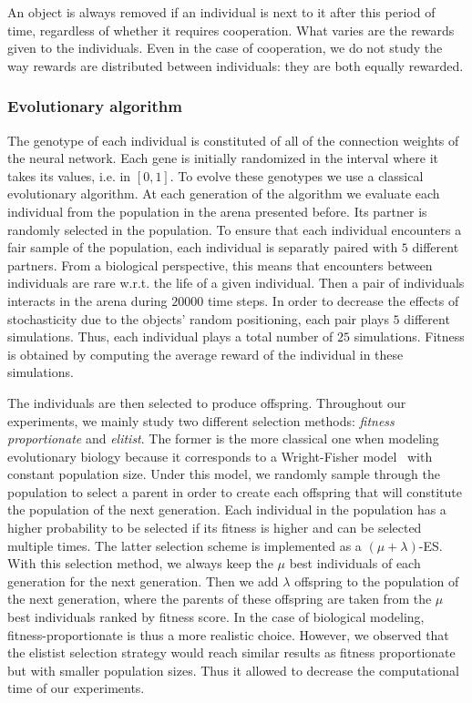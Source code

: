         An object is always removed if an individual is next to it after this period of time, regardless of whether it requires cooperation. What varies are the rewards given to the individuals. Even in the case of cooperation, we do not study the way rewards are distributed between individuals: they are both equally rewarded.

    \subsubsection{Evolutionary algorithm} 

        The genotype of each individual is constituted of all of the connection weights of the neural network. Each gene is initially randomized in the interval where it takes its values, i.e. in \([0,1]\). To evolve these genotypes we use a classical evolutionary algorithm. At each generation of the algorithm we evaluate each individual from the population in the arena presented before. Its partner is randomly selected in the population. To ensure that each individual encounters a fair sample of the population, each individual is separatly paired with $5$ different partners. From a biological perspective, this means that encounters between individuals are rare w.r.t. the life of a given individual. Then a pair of individuals interacts in the arena during $20000$ time steps. In order to decrease the effects of stochasticity due to the objects' random positioning, each pair plays $5$ different simulations. Thus, each individual plays a total number of $25$ simulations. Fitness is obtained by computing the average reward of the individual in these simulations.

        The individuals are then selected to produce offspring. Throughout our experiments, we mainly study two different selection methods: \emph{fitness proportionate} and \emph{elitist}. The former is the more classical one when modeling evolutionary biology because it corresponds to a Wright-Fisher model~\parencite{Wright1931} with constant population size. Under this model, we randomly sample through the population to select a parent in order to create each offspring that will constitute the population of the next generation. Each individual in the population has a higher probability to be selected if its fitness is higher and can be selected multiple times. The latter selection scheme is implemented as a \((\mu + \lambda)\)-ES. With this selection method, we always keep the $\mu$ best individuals of each generation for the next generation. Then we add $\lambda$ offspring to the population of the next generation, where the parents of these offspring are taken from the $\mu$ best individuals ranked by fitness score. In the case of biological modeling, fitness-proportionate is thus a more realistic choice. However, we observed that the elistist selection strategy would reach similar results as fitness proportionate but with smaller population sizes. Thus it allowed to decrease the computational time of our experiments.

